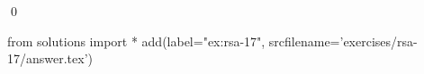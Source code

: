
\begin{ex} 
  \label{ex:rsa-17}
  
  \qed
\end{ex} 
\begin{python0}
from solutions import *
add(label="ex:rsa-17",
    srcfilename='exercises/rsa-17/answer.tex') 
\end{python0}
